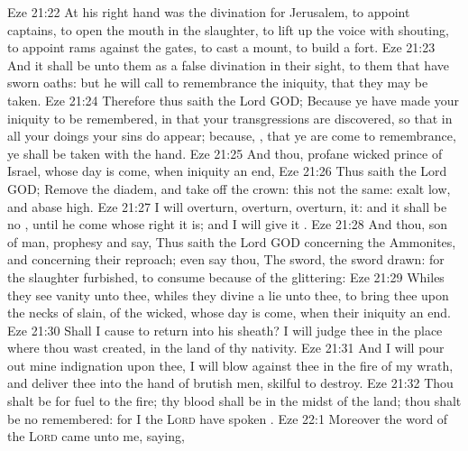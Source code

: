 \vs Eze 21:22 At his right hand was the divination for Jerusalem, to appoint captains, to open the mouth in the slaughter, to lift up the voice with shouting, to appoint  rams against the gates, to cast a mount,  to build a fort.
\vs Eze 21:23 And it shall be unto them as a false divination in their sight, to them that have sworn oaths: but he will call to remembrance the iniquity, that they may be taken.
\vs Eze 21:24 Therefore thus saith the Lord GOD; Because ye have made your iniquity to be remembered, in that your transgressions are discovered, so that in all your doings your sins do appear; because, , that ye are come to remembrance, ye shall be taken with the hand.
\vs Eze 21:25 And thou, profane wicked prince of Israel, whose day is come, when iniquity  an end,
\vs Eze 21:26 Thus saith the Lord GOD; Remove the diadem, and take off the crown: this  not  the same: exalt  low, and abase  high.
\vs Eze 21:27 I will overturn, overturn, overturn, it: and it shall be no , until he come whose right it is; and I will give it .
\vs Eze 21:28 And thou, son of man, prophesy and say, Thus saith the Lord GOD concerning the Ammonites, and concerning their reproach; even say thou, The sword, the sword  drawn: for the slaughter  furbished, to consume because of the glittering:
\vs Eze 21:29 Whiles they see vanity unto thee, whiles they divine a lie unto thee, to bring thee upon the necks of  slain, of the wicked, whose day is come, when their iniquity  an end.
\vs Eze 21:30 Shall I cause  to return into his sheath? I will judge thee in the place where thou wast created, in the land of thy nativity.
\vs Eze 21:31 And I will pour out mine indignation upon thee, I will blow against thee in the fire of my wrath, and deliver thee into the hand of brutish men,  skilful to destroy.
\vs Eze 21:32 Thou shalt be for fuel to the fire; thy blood shall be in the midst of the land; thou shalt be no  remembered: for I the \textsc{Lord} have spoken .
\vs Eze 22:1 Moreover the word of the \textsc{Lord} came unto me, saying,
